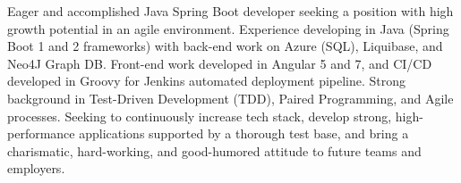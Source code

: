 
\begin{cventries}
  \cventry
  \par{
	Eager and accomplished Java Spring Boot developer seeking a position with high growth potential in an agile environment. Experience developing in Java (Spring Boot 1 and 2 frameworks) with back-end work on Azure (SQL), Liquibase, and Neo4J Graph DB. Front-end work developed in Angular 5 and 7, and CI/CD developed in Groovy for Jenkins automated deployment pipeline. Strong background in Test-Driven Development (TDD), Paired Programming, and Agile processes. Seeking to continuously increase tech stack, develop strong, high-performance applications supported by a thorough test base, and bring a charismatic, hard-working, and good-humored attitude to future teams and employers.
}
\end{cventries}